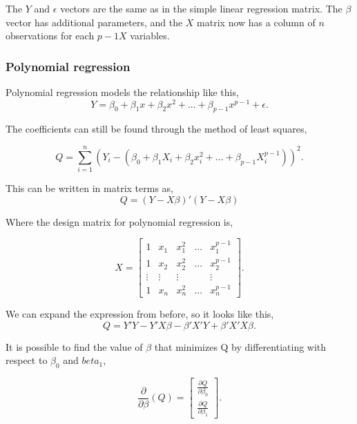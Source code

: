 \noindent The $Y$ and $\epsilon$ vectors are the same as in the simple linear regression matrix. The $\beta$ vector has additional parameters, and the $X$ matrix now has a column of $n$ observations for each $p-1 X$ variables. 

\subsubsection{Polynomial regression}
Polynomial regression models the relationship like this, 
\begin{equation}
	Y=\beta_0 + \beta_1 x + \beta_2 x^2	+ ... + \beta_{p-1} x^{p-1}+ \epsilon .
	\end{equation}

\noindent The coefficients can still be found through the method of least squares,

\begin{equation}
	Q=\sum_{i=1}^{n}(Y_i -(\beta_0 + \beta_1 X_i + \beta_2 x_i^2 + ... + \beta_{p-1}X_{i}^{p-1}))^2 .
\end{equation}
\newline

\noindent This can be written in matrix terms as,
\begin{equation}
	Q=(Y-X\beta)' (Y-X\beta) 
\end{equation}

\noindent Where the design matrix for polynomial regression is, 

\begin{equation}
	 X=
\left[
\begin{array}{ccccc}
	1&x_1&x_1^2&...&x_1^{p-1}\\ 
	1&x_2&x_2^2&...&x_2^{p-1} \\
	\vdots & \vdots &\vdots &&\vdots\\
	1&x_n&x_n^2&...&x_n^{p-1} 
\end{array}
\right].
\end{equation}

\noindent We can expand the expression from before, so it looks like this,
\begin{equation}
	Q=Y' Y -Y' X \beta -\beta' X' Y + \beta' X' X \beta .
\end{equation}


\noindent It is possible to find the value of $\beta$ that minimizes Q by differentiating with respect to $\beta_0$ and $beta_1$,

\begin{equation}
\frac{\partial}{\partial \beta}(Q)=
\left[
\begin{array}{c}
	\frac{\partial Q}{\partial \beta_0}\\ 
	\frac{\partial Q}{\partial \beta_1}
\end{array}
\right].
\end{equation}

